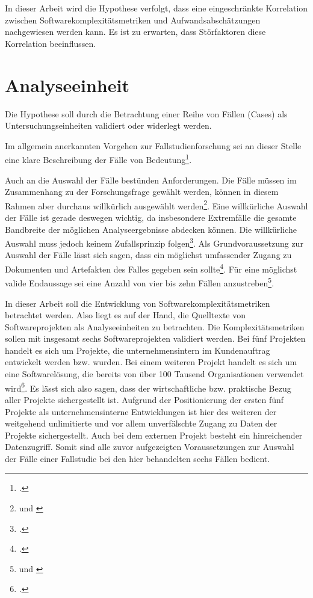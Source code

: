 In dieser Arbeit wird die Hypothese verfolgt, dass eine eingeschränkte
Korrelation zwischen Softwarekomplexitätsmetriken und
Aufwandsabschätzungen nachgewiesen werden kann. Es ist zu erwarten, dass
Störfaktoren diese Korrelation beeinflussen.

\section{Analyseeinheit}\label{analyseeinheit}

Die Hypothese soll durch die Betrachtung einer Reihe von Fällen (Cases)
als Untersuchungseinheiten validiert oder widerlegt werden.

Im allgemein anerkannten Vorgehen zur Fallstudienforschung sei an dieser
Stelle eine klare Beschreibung der Fälle von Bedeutung\footcite[Vgl. ][S. 610]{dubeRigorInformationSystems2003}.

Auch an die Auswahl der Fälle bestünden Anforderungen. Die Fälle müssen
im Zusammenhang zu der Forschungsfrage gewählt werden, können in diesem
Rahmen aber durchaus willkürlich ausgewählt werden\footnote{\cite[Vgl ][S. 72f]{millsEncyclopediaCaseStudy2010} und \cite[][S. 72]{yinCaseStudyResearch2014}}.
Eine willkürliche Auswahl der Fälle ist gerade deswegen wichtig, da
insbesondere Extremfälle die gesamte Bandbreite der möglichen
Analyseergebnisse abdecken können. Die willkürliche Auswahl muss jedoch
keinem Zufallsprinzip folgen\footcite[Vgl. ][S. 12ff]{gothlichFallstudienAlsForschungsmethode2003}.
Als Grundvoraussetzung zur Auswahl der Fälle lässt sich sagen, dass ein
möglichst umfassender Zugang zu Dokumenten und Artefakten des Falles
gegeben sein sollte\footcite[Vgl. ][S. 68]{millsEncyclopediaCaseStudy2010}. Für eine
möglichst valide Endaussage sei eine Anzahl von vier bis zehn Fällen
anzustreben\footnote{\cite[Vgl. ][S. 9]{gothlichFallstudienAlsForschungsmethode2003} und \cite[][S. 609]{dubeRigorInformationSystems2003}}.

In dieser Arbeit soll die Entwicklung von Softwarekomplexitätsmetriken
betrachtet werden. Also liegt es auf der Hand, die Quelltexte von
Softwareprojekten als Analyseeinheiten zu betrachten. Die
Komplexitätsmetriken sollen mit insgesamt sechs Softwareprojekten
validiert werden. Bei fünf Projekten handelt es sich um Projekte, die
unternehmensintern im Kundenauftrag entwickelt werden bzw. wurden. Bei
einem weiteren Projekt handelt es sich um eine Softwarelösung, die
bereits von über 100 Tausend Organisationen verwendet wird\footcite[Vgl. ][]{GitLabGitLab}.
Es lässt sich also sagen, dass der wirtschaftliche bzw. praktische Bezug
aller Projekte sichergestellt ist. Aufgrund der Positionierung der
ersten fünf Projekte als unternehmensinterne Entwicklungen ist hier des
weiteren der weitgehend unlimitierte und vor allem unverfälschte Zugang
zu Daten der Projekte sichergestellt. Auch bei dem externen Projekt
besteht ein hinreichender Datenzugriff. Somit sind alle zuvor
aufgezeigten Voraussetzungen zur Auswahl der Fälle einer Fallstudie bei
den hier behandelten sechs Fällen bedient.

